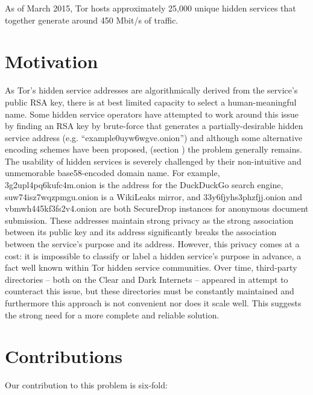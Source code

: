 As of March 2015, Tor hosts approximately 25,000 unique hidden services that together generate around 450 Mbit/s of traffic.\cite{TorMetrics}

\section{Motivation}
\label{sec:Motivation}

As Tor's hidden service addresses are algorithmically derived from the service's public RSA key, there is at best limited capacity to select a human-meaningful name. Some hidden service operators have attempted to work around this issue by finding an RSA key by brute-force that generates a partially-desirable hidden service address (e.g. ``example0uyw6wgve.onion'') and although some alternative encoding schemes have been proposed, (section \label{sec:EncodingSchemes}) the problem generally remains. The usability of hidden services is severely challenged by their non-intuitive and unmemorable base58-encoded domain name. For example, 3g2upl4pq6kufc4m.onion is the address for the DuckDuckGo search engine, \\ suw74isz7wqzpmgu.onion is a WikiLeaks mirror, and 33y6fjyhs3phzfjj.onion and \\ vbmwh445kf3fs2v4.onion are both SecureDrop instances for anonymous document submission. These addresses maintain strong privacy as the strong association between its public key and its address significantly breaks the association between the service's purpose and its address. However, this privacy comes at a cost: it is impossible to classify or label a hidden service's purpose in advance, a fact well known within Tor hidden service communities. Over time, third-party directories -- both on the Clear and Dark Internets -- appeared in attempt to counteract this issue, but these directories must be constantly maintained and furthermore this approach is not convenient nor does it scale well. This suggests the strong need for a more complete and reliable solution.

\section{Contributions}

Our contribution to this problem is six-fold:


